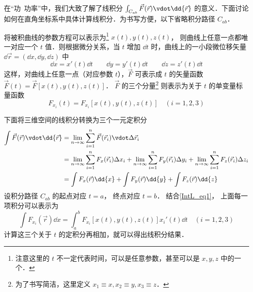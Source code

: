 

在“功\ 功率”中，我们大致了解了线积分 $\int_{C_{ab}} \vec F(\vec r) \vdot \dd{\vec r} $ 的意义．下面讨论如何在直角坐标系中具体计算线积分．为书写方便，以下省略积分路径 $C_{ab}$． 

将被积曲线的参数方程可以表示为\footnote{注意这里的 $t$ 不一定代表时间，可以是任意参数，甚至可以是 $x,y,z$ 中的一个．} $x(t),y(t),z(t)$， 则曲线上任意一点都唯一对应一个 $t$ 值．则根据微分关系，当 $t$ 增加 $\dd{t}$ 时，曲线上的一小段微位移矢量 $\dd{\vec r} = (\dd{x}, \dd{y}, \dd{z})$ 中
\begin{equation}\label{IntL_eq1}
\dd{x} = x'(t) \dd{t} \qquad \dd{y} = y'(t) \dd{t} \qquad \dd{z} = z'(t) \dd{t}
\end{equation}
这样，对曲线上任意一点（对应参数 $t$），$\vec F$ 可表示成 $t$ 的矢量函数 $\vec F(t) = \vec F[x(t),y(t),z(t)]$．  $\vec F$ 的三个分量\footnote{为了书写简洁，这里定义 $x_1\equiv x, x_2\equiv y,x_3\equiv z$．} 则表示为关于 $t$ 的单变量标量函数
\begin{equation}
{F_{x_i}}(t) = {F_{x_i}}[x(t),y(t),z(t)] \quad (i = 1,2,3)
\end{equation}

下面将三维空间的线积分转换为三个一元定积分
\begin{equation}\begin{aligned}
\int \vec F(\vec r) \vdot \dd{\vec r}  &= \lim_{n \to \infty } \sum_{i = 1}^n \vec F(\vec r_i) \vdot \Delta \vec r_i\\
&= \lim_{n \to \infty } \sum_{i = 1}^n F_x(\vec r_i)\Delta {x_i} + \lim_{n \to \infty } \sum_{i = 1}^n F_y(\vec r_i)\Delta{y_i} + \lim_{n \to \infty } \sum_{i = 1}^n F_z(\vec r_i)\Delta{z_i} \\
&= \int {F_x}(\vec r) \dd{x}  + \int {F_y}(\vec r) \dd{y}  + \int {F_z}(\vec r) \dd{z} 
\end{aligned}\end{equation} 
设积分路径 ${C_{ab}}$ 的起点对应 $t = a$， 终点对应 $t = b$． 结合\autoref{IntL_eq1}， 上面每一项积分可以表示为 
\begin{equation}\label{IntL_eq4}
\int {F_{x_i}}(\vec r) \dd{x}  = \int_a^b F_{x_i} [x(t),y(t),z(t)] x_i'(t) \dd{t} \quad (i=1,2,3)
\end{equation} 
计算这三个关于 $t$ 的定积分再相加，就可以得出线积分结果．

